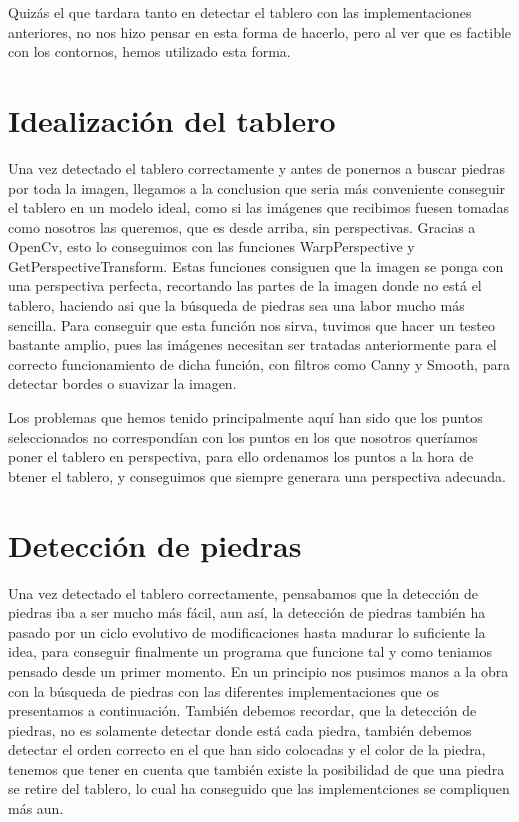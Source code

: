 \documentclass[12pt,a4papert,woside,openright,titlepage,final]{book}
\begin{document}
Quizás el que tardara tanto en detectar el tablero con las implementaciones
anteriores, no nos hizo pensar en esta forma de hacerlo, pero al ver que es
factible con los contornos, hemos utilizado esta forma.



\section{Idealización del tablero} 

Una vez detectado el tablero correctamente y antes de ponernos a buscar piedras
por toda la imagen, llegamos a la conclusion que seria más conveniente conseguir
el tablero en un modelo ideal, como si las imágenes que recibimos fuesen tomadas
como nosotros las queremos, que es desde arriba, sin perspectivas.  Gracias a
OpenCv, esto lo conseguimos con las funciones WarpPerspective y
GetPerspectiveTransform. Estas funciones consiguen que la imagen se ponga con
una perspectiva perfecta, recortando las partes de la imagen donde no está el
tablero, haciendo asi que la búsqueda de piedras sea una labor mucho más
sencilla. Para conseguir que esta función nos sirva, tuvimos que hacer un testeo
bastante amplio, pues las imágenes necesitan ser tratadas anteriormente para el
correcto funcionamiento de dicha función, con filtros como Canny y Smooth, para
detectar bordes o suavizar la imagen. 

Los problemas que hemos tenido principalmente aquí han sido que los puntos
seleccionados no correspondían con los puntos en los que nosotros queríamos
poner el tablero en perspectiva, para ello ordenamos los puntos a la hora de
btener el tablero, y conseguimos que siempre generara una perspectiva adecuada. 



\section{Detección de piedras} 

Una vez detectado el tablero correctamente, pensabamos que la detección de
piedras iba a ser mucho más fácil, aun así, la detección de piedras también ha
pasado por un ciclo evolutivo de modificaciones hasta madurar lo suficiente la
idea, para conseguir finalmente un programa que funcione tal y como teniamos
pensado desde un primer momento. En un principio nos pusimos manos a la obra con
la búsqueda de piedras con las diferentes implementaciones que os presentamos a
continuación. También debemos recordar, que la detección de piedras, no es
solamente detectar donde está cada piedra, también debemos detectar el orden
correcto en el que han sido colocadas y el color de la piedra, tenemos que tener
en cuenta que también existe la posibilidad de que una piedra se retire del
tablero, lo cual ha conseguido que las implementciones se compliquen más aun.   
\end{document}
